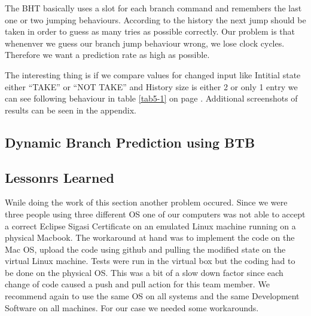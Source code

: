 The BHT basically uses a slot for each branch command and remembers the last one or two jumping behaviours. According to the history the next jump should be taken in order to guess as many tries as possible correctly. Our problem is that whenenver we guess our branch jump behaviour wrong, we lose clock cycles. Therefore we want a prediction rate as high as possible. 

The interesting thing is if we compare values for changed input like Intitial state either ``TAKE'' or ``NOT TAKE'' and History size is either 2 or only 1 entry we can see following behaviour in table \ref{tab5-1} on page \pageref{tab5-1}. Additional screenshots of results can be seen in the appendix.

\begin{table}[h]
\end{table}


\subsection{Dynamic Branch Prediction using BTB}

\subsection{Lessonrs Learned}
Wnile doing the work of this section another problem occured. Since we were three people using three different OS one of our computers was not able to accept a correct Eclipse Sigasi Certificate on an emulated Linux machine running on a physical Macbook. The workaround at hand was to implement the code on the Mac OS, upload the code using github and pulling the modified  state on the virtual Linux machine. Tests were run in the virtual box but the coding had to be done on the physical OS. This was a bit of a slow down factor since each change of code caused a push and pull action for this team member. We recommend again to use the same OS on all systems and the same Development Software on all machines. For our case we needed some workarounds.
